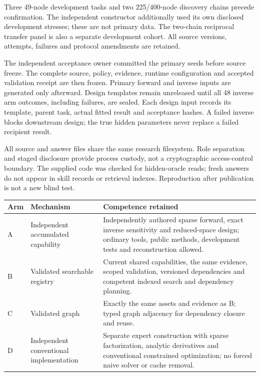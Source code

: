 \documentclass[11pt,letterpaper]{article}
\begin{document}
Three 49-node development tasks and two 225/400-node discovery chains precede confirmation. The independent constructor additionally used its own disclosed development stresses; these are not primary data. The two-chain reciprocal transfer panel is also a separate development cohort. All source versions, attempts, failures and protocol amendments are retained.

The independent acceptance owner committed the primary seeds before source freeze. The complete source, policy, evidence, runtime configuration and accepted validation receipt are then frozen. Primary forward and inverse inputs are generated only afterward. Design templates remain unreleased until all 48 inverse arm outcomes, including failures, are sealed. Each design input records its template, parent task, actual fitted result and acceptance hashes. A failed inverse blocks downstream design; the true hidden parameters never replace a failed recipient result.

All source and answer files share the same research filesystem. Role separation and staged disclosure provide process custody, not a cryptographic access-control boundary. The supplied code was checked for hidden-oracle reads; fresh answers do not appear in skill records or retrieval indexes. Reproduction after publication is not a new blind test.

\begin{longtable}{p{}p{}p{}}
\toprule
Arm & Mechanism & Competence retained\\
\midrule
A & Independent accumulated capability & Independently authored sparse forward, exact inverse sensitivity and reduced-space design; ordinary tools, public methods, development tests and reconstruction allowed.\\
B & Validated searchable registry & Current shared capabilities, the same evidence, scoped validation, versioned dependencies and competent indexed search and dependency planning.\\
C & Validated graph & Exactly the same assets and evidence as B; typed graph adjacency for dependency closure and reuse.\\
D & Independent conventional implementation & Separate expert construction with sparse factorization, analytic derivatives and conventional constrained optimization; no forced naive solver or cache removal.\\
\bottomrule
\end{longtable}
\end{document}
